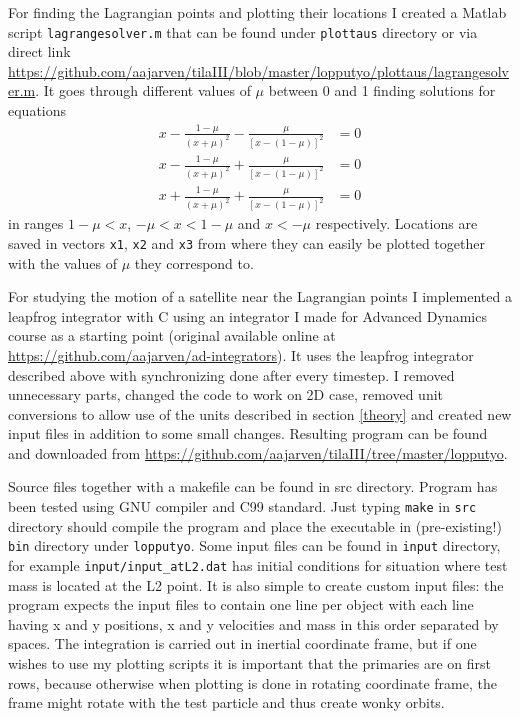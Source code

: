 \documentclass[12pt,a4paper,titlepage]{article}
\begin{document}
For finding the Lagrangian points and plotting their locations I created a Matlab script \texttt{lagrangesolver.m} that can be found under \texttt{plottaus} directory or via direct link \url{https://github.com/aajarven/tilaIII/blob/master/lopputyo/plottaus/lagrangesolver.m}. It goes through different values of $\mu$ between 0 and 1 finding solutions for equations
\begin{align*}
x - \frac{1-\mu}{(x+\mu)^2} - \frac{\mu}{[x-(1-\mu)]^2} &= 0 \\
x - \frac{1-\mu}{(x+\mu)^2} + \frac{\mu}{[x-(1-\mu)]^2} &= 0 \\
x + \frac{1-\mu}{(x+\mu)^2} + \frac{\mu}{[x-(1-\mu)]^2} &= 0 
\end{align*}
in ranges $1-\mu<x$, $-\mu<x<1-\mu$ and $x<-\mu$ respectively. Locations are saved in vectors \texttt{x1}, \texttt{x2} and \texttt{x3} from where they can easily be plotted together with the values of $\mu$ they correspond to.

For studying the motion of a satellite near the Lagrangian points I implemented a leapfrog integrator with C using an integrator I made for Advanced Dynamics course as a starting point (original available online at \url{https://github.com/aajarven/ad-integrators}). It uses the leapfrog integrator described above with synchronizing done after every timestep. I removed unnecessary parts, changed the code to work on 2D case, removed unit conversions to allow use of the units described in section \ref{theory} and created new input files in addition to some small changes. Resulting program can be found and downloaded from \url{https://github.com/aajarven/tilaIII/tree/master/lopputyo}.

Source files together with a makefile can be found in src directory. Program has been tested using GNU compiler and C99 standard. Just typing \texttt{make} in \texttt{src} directory should compile the program and place the executable in (pre-existing!) \texttt{bin} directory under \texttt{lopputyo}. Some input files can be found in \texttt{input} directory, for example \texttt{input/input\_atL2.dat} has initial conditions for situation where test mass is located at the L2 point. It is also simple to create custom input files: the program expects the input files to contain one line per object with each line having x and y positions, x and y velocities and mass in this order separated by spaces. The integration is carried out in inertial coordinate frame, but if one wishes to use my plotting scripts it is important that the primaries are on first rows, because otherwise when plotting is done in rotating coordinate frame, the frame might rotate with the test particle and thus create wonky orbits.
\end{document}

